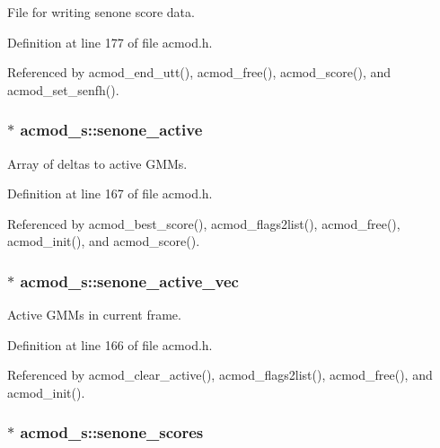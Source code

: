 \-File for writing senone score data. 



\-Definition at line 177 of file acmod.\-h.



\-Referenced by acmod\-\_\-end\-\_\-utt(), acmod\-\_\-free(), acmod\-\_\-score(), and acmod\-\_\-set\-\_\-senfh().

\subsubsection[{senone\-\_\-active}]{$\ast$ {\bf acmod\-\_\-s\-::senone\-\_\-active}}\label{structacmod__s_a5c98c727daf4e6bb23534e00b30cb5c2}


\-Array of deltas to active \-G\-M\-Ms. 



\-Definition at line 167 of file acmod.\-h.



\-Referenced by acmod\-\_\-best\-\_\-score(), acmod\-\_\-flags2list(), acmod\-\_\-free(), acmod\-\_\-init(), and acmod\-\_\-score().

\subsubsection[{senone\-\_\-active\-\_\-vec}]{$\ast$ {\bf acmod\-\_\-s\-::senone\-\_\-active\-\_\-vec}}\label{structacmod__s_a4a3ad3a3dc9a7b36c024c77729012e55}


\-Active \-G\-M\-Ms in current frame. 



\-Definition at line 166 of file acmod.\-h.



\-Referenced by acmod\-\_\-clear\-\_\-active(), acmod\-\_\-flags2list(), acmod\-\_\-free(), and acmod\-\_\-init().

\subsubsection[{senone\-\_\-scores}]{$\ast$ {\bf acmod\-\_\-s\-::senone\-\_\-scores}}\label{structacmod__s_aa341539b98a5b13bef8589fc8d948da8}



